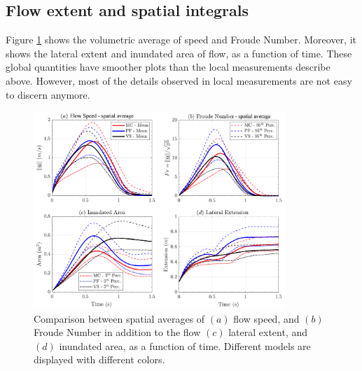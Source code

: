 \documentclass{article}
\begin{document}
\subsection{Flow extent and spatial integrals}
Figure \ref{fig:Ramp-spatial} shows the volumetric average of speed and Froude Number. Moreover, it shows the lateral extent and inundated area of flow, as a function of time. These global quantities have smoother plots than the local measurements describe above. However, most of the details observed in local measurements are not easy to discern anymore.
\begin{figure}[H]
        \centering
        \includegraphics[width=0.85\textwidth]{figures/incline/AveragedIncline.png}
        \caption{Comparison between spatial averages of $(a)$ flow speed, and $(b)$ Froude Number in addition to the flow $(c)$ lateral extent, and $(d)$ inundated area, as a function of time. Different models are displayed with different colors.}
        \label{fig:Ramp-spatial}
\end{figure}
\end{document}

